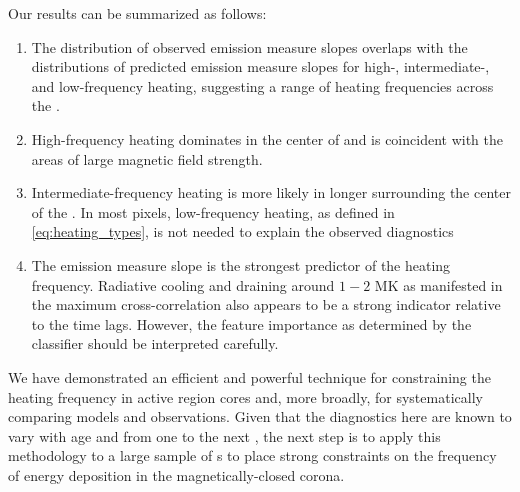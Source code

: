 Our results can be summarized as follows:
\begin{enumerate}
    \item The distribution of observed emission measure slopes overlaps with the distributions of predicted emission measure slopes for high-, intermediate-, and low-frequency heating, suggesting a range of heating frequencies across the \AR{}.
    \item High-frequency heating dominates in the center of \AR{} and is coincident with the areas of large magnetic field strength.
    \item Intermediate-frequency heating is more likely in longer  surrounding the center of the \AR{}. In most pixels, low-frequency heating, as defined in \autoref{eq:heating_types}, is not needed to explain the observed diagnostics
    \item The emission measure slope is the strongest predictor of the heating frequency. Radiative cooling and draining around $1-2$ MK as manifested in the maximum cross-correlation also appears to be a strong indicator relative to the time lags. However, the feature importance as determined by the classifier should be interpreted carefully.
\end{enumerate}

We have demonstrated an efficient and powerful technique for constraining the heating frequency in active region cores and, more broadly, for systematically comparing models and observations.
Given that the diagnostics here are known to vary with age \citep[e.g.][]{schmelz_cold_2012,del_zanna_evolution_2015} and from one \AR{} to the next \citep{warren_systematic_2012,viall_survey_2017}, the next step is to apply this methodology to a large sample of \AR s to place strong constraints on the frequency of energy deposition in the magnetically-closed corona.
